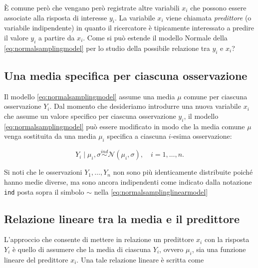 \documentclass[
]{memoir}
\begin{document}
È comune però che vengano però registrate altre variabili \(x_i\) che possono essere associate alla risposta di interesse \(y_i\). La variabile \(x_i\) viene chiamata \emph{predittore} (o variabile indipendente) in quanto il ricercatore è tipicamente interessato a predire il valore \(y_i\) a partire da \(x_i\). Come si può estende il modello Normale della \eqref{eq:normalsamplingmodel} per lo studio della possibile relazione tra \(y_i\) e \(x_i\)?

\hypertarget{una-media-specifica-per-ciascuna-osservazione}{%
\subsection{Una media specifica per ciascuna osservazione}\label{una-media-specifica-per-ciascuna-osservazione}}

Il modello \eqref{eq:normalsamplingmodel} assume una media \(\mu\) comune per ciascuna osservazione \(Y_i\). Dal momento che desideriamo introdurre una nuova variabile \(x_i\) che assume un valore specifico per ciascuna osservazione \(y_i\), il modello \eqref{eq:normalsamplingmodel} può essere modificato in modo che la media comune \(\mu\) venga sostituita da una media \(\mu_i\) specifica a ciascuna \(i\)-esima osservazione:

\begin{equation}
Y_i \mid \mu_i, \sigma \stackrel{ind}{\sim} \mathcal{N}(\mu_i, \sigma), \quad i = 1, \dots, n.
\label{eq:normalsamplinglinearmodel}
\end{equation}

Si noti che le osservazioni \(Y_1, \dots, Y_n\) non sono più identicamente distribuite poiché hanno medie diverse, ma sono ancora indipendenti come indicato dalla notazione \texttt{ind} posta sopra il simbolo \(\sim\) nella \eqref{eq:normalsamplinglinearmodel}

\hypertarget{relazione-lineare-tra-la-media-e-il-predittore}{%
\subsection{Relazione lineare tra la media e il predittore}\label{relazione-lineare-tra-la-media-e-il-predittore}}

L'approccio che consente di mettere in relazione un predittore \(x_i\) con la risposta \(Y_i\) è quello di assumere che la media di ciascuna \(Y_i\), ovvero \(\mu_i\), sia una funzione lineare del predittore \(x_i\). Una tale relazione lineare è scritta come
\end{document}
